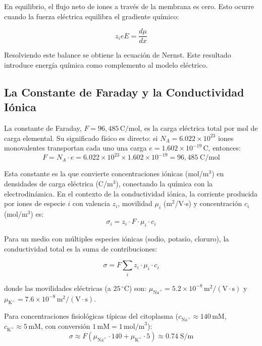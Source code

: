 \documentclass[12pt]{article}
\begin{document}
En equilibrio, el flujo neto de iones a trav\'es de la membrana es cero. Esto ocurre cuando la
fuerza el\'ectrica equilibra el gradiente qu\'imico:

\begin{equation}
z_i e E = \frac{d\mu}{dx}
\end{equation}

Resolviendo este balance se obtiene la ecuaci\'on de Nernst. Este resultado introduce energ\'ia
qu\'imica como complemento al modelo el\'ectrico.

\subsection{La Constante de Faraday y la Conductividad I\'onica}

La constante de Faraday, $F = 96{,}485\,\text{C/mol}$, es la carga el\'ectrica
total por mol de carga elemental. Su significado f\'isico es directo: si
$N_A = 6.022\times10^{23}$ iones monovalentes transportan cada uno una carga
$e = 1.602\times10^{-19}\,\text{C}$, entonces:
\begin{equation}
F = N_A \cdot e = 6.022\times10^{23} \times 1.602\times10^{-19} = 96{,}485\;\text{C/mol}
\end{equation}

Esta constante es la que convierte concentraciones i\'onicas (mol/m$^3$) en
densidades de carga el\'ectrica (C/m$^3$), conectando la qu\'imica con la
electrodin\'amica. En el contexto de la conductividad i\'onica, la corriente
producida por iones de especie $i$ con valencia $z_i$, movilidad $\mu_i$
(m$^2$/V$\cdot$s) y concentraci\'on $c_i$ (mol/m$^3$) es:
\begin{equation}
\sigma_i = z_i \cdot F \cdot \mu_i \cdot c_i
\end{equation}

Para un medio con m\'ultiples especies i\'onicas (sodio, potasio, cloruro), la
conductividad total es la suma de contribuciones:

\begin{equation}
\boxed{
\sigma = F \sum_i z_i \cdot \mu_i \cdot c_i
}
\label{eq:sigma_ionica}
\end{equation}

donde las movilidades el\'ectricas (a $25\,^\circ\text{C}$) son:
$\mu_{\text{Na}^+} = 5.2\times10^{-8}\,\text{m}^2/(\text{V}\cdot\text{s})$ y
$\mu_{\text{K}^+} = 7.6\times10^{-8}\,\text{m}^2/(\text{V}\cdot\text{s})$.

Para concentraciones fisiol\'ogicas t\'ipicas del citoplasma
($c_{\text{Na}^+} \approx 140\,\text{mM}$, $c_{\text{K}^+} \approx 5\,\text{mM}$,
con conversi\'on $1\,\text{mM} = 1\,\text{mol/m}^3$):
\begin{equation}
\sigma \approx F\left(\mu_{\text{Na}^+}\cdot 140 + \mu_{\text{K}^+}\cdot 5\right)
\approx 0.74\;\text{S/m}
\end{equation}
\end{document}
